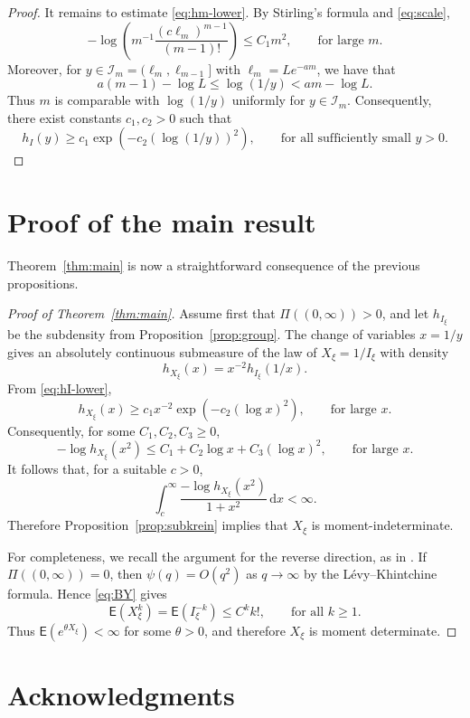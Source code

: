 \documentclass[10pt,a4paper]{amsart}
\newcommand{\E}{\mathsf E}
\newcommand{\1}{\mathbf 1}
\newcommand{\dd}{\mathrm d}
\begin{document}
\begin{proof}
It remains to estimate \eqref{eq:hm-lower}. By Stirling's formula and \eqref{eq:scale},
\[
 -\log\left(
 m^{-1}\frac{(c\ell_m)^{m-1}}{(m-1)!}
 \right)
 \leq C_1m^2,
 \qquad \text{for large $m$.}
\]
Moreover, for $y\in\mathcal I_m=(\ell_m,\ell_{m-1}]$ with $\ell_m=Le^{-am}$, we have that
\[
 a(m-1)-\log L
 \leq
 \log(1/y)
 <
 am-\log L.
\]
Thus $m$ is comparable with $\log(1/y)$ uniformly for $y\in\mathcal I_m$. Consequently, there exist constants $c_1,c_2>0$ such that \[ h_I(y)\geq c_1\exp\left(-c_2(\log(1/y))^2\right), \qquad \text{for all sufficiently small }y>0. \]
\end{proof}
\section{Proof of the main result}

Theorem~\ref{thm:main} is now a straightforward consequence of the previous propositions.


\begin{proof}[Proof of Theorem~\ref{thm:main}]
Assume first that $\Pi((0,\infty))>0$, and let $h_{I_\xi}$ be the subdensity from Proposition~\ref{prop:group}. The change of variables $x=1/y$ gives an absolutely continuous submeasure of the law of $X_\xi=1/I_\xi$ with density
\[
 h_{X_\xi}(x)=x^{-2}h_{I_\xi}(1/x).
\]
From \eqref{eq:hI-lower},
\[
 h_{X_\xi}(x)\geq c_1x^{-2}\exp\left(-c_2(\log x)^2\right),
 \qquad
 \text{for large }x.
\]
Consequently, for some $C_1,C_2,C_3\geq0$,
\[
 -\log h_{X_\xi}(x^2)
 \leq
 C_1+C_2\log x+C_3(\log x)^2,
 \qquad
 \text{for large }x.
\]
It follows that, for a suitable $c>0$,
\[
 \int_c^\infty \frac{-\log h_{X_\xi}(x^2)}{1+x^2}\,\dd x<\infty.
\]
Therefore Proposition~\ref{prop:subkrein} implies that $X_\xi$ is moment-indeterminate.

For completeness, we recall the argument for the reverse direction, as in \cite{Bertoin-Yor-2002}. If $\Pi((0,\infty))=0$, then $\psi(q)=O(q^2)$ as $q\to\infty$ by the L\'evy--Khintchine formula. Hence \eqref{eq:BY} gives
\[
 \E(X_\xi^k)=\E(I_\xi^{-k})\leq C^k k!,
 \qquad
 \text{for all }k\geq1.
\]
Thus $\E(e^{\theta X_\xi})<\infty$ for some $\theta>0$, and therefore $X_\xi$ is moment determinate.
\end{proof}

\section*{Acknowledgments}
\end{document}
